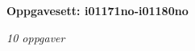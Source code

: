 \centerline{\bf Oppgavesett: i01171no-i01180no}
\vskip 10pt
\centerline{\it 10 oppgaver}\vskip 10pt
\vskip 10pt
